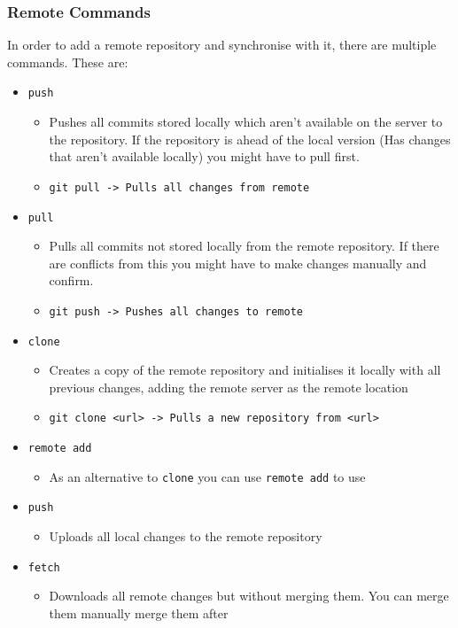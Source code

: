 \documentclass{article}
\begin{document}
	\subsubsection{Remote Commands}
	In order to add a remote repository and synchronise with it, there are multiple commands. These are:
	\begin{itemize}
		\item{\texttt{push}}
		\begin{itemize}
			\item{Pushes all commits stored locally which aren't available on the server to the repository. If the repository is ahead of the local version (Has changes that aren't available locally) you might have to pull first.}
			\item{\texttt{git pull -> Pulls all changes from remote}}
		\end{itemize}
		\item{\texttt{pull}}
		\begin{itemize}
			\item{Pulls all commits not stored locally from the remote repository. If there are conflicts from this you might have to make changes manually and confirm.}
			\item{\texttt{git push -> Pushes all changes to remote}}
		\end{itemize}
		\item{\texttt{clone}}
		\begin{itemize}
			\item{Creates a copy of the remote repository and initialises it locally with all previous changes, adding the remote server as the remote location}
			\item{\texttt{git clone <url> -> Pulls a new repository from <url>}}
		\end{itemize}
		\item{\texttt{remote add}}
		\begin{itemize}
			\item{As an alternative to \texttt{clone} you can use \texttt{remote add} to use} 
		\end{itemize}
		\item{\texttt{push}}
		\begin{itemize}
			\item{Uploads all local changes to the remote repository}
		\end{itemize}
		\item{\texttt{fetch}}
		\begin{itemize}
			\item{Downloads all remote changes but without merging them. You can merge them manually merge them after}

\end{itemize}
\end{itemize}
\end{document}
